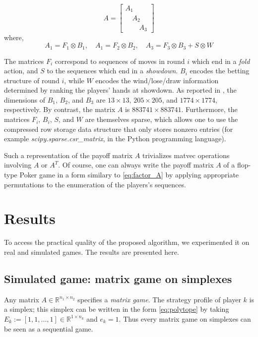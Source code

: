 \documentclass{article} %
\begin{document}
\begin{equation}
  A = \begin{bmatrix}A_1\hspace{2em}\\\hspace{1em}A_2\hspace{1em}\\\hspace{2em}A_3\end{bmatrix}
\label{eq:factor_A}
\end{equation}
where,
\begin{equation}
A_1 = F_1 \otimes B_1, \hspace{1em} A_1 = F_2 \otimes B_2, \hspace{1em} A_3 = F_3 \otimes B_3 + S \otimes W
\end{equation}

The matrices $F_i$ correspond to sequences of moves in round $i$ which end in a \textit{fold} action, and $S$ to the sequences which end in a \textit{showdown}. $B_i$ encodes the betting structure of round $i$, while $W$ encodes the wind/lose/draw information determined by ranking the players' hands at showdown. As reported in \cite{hoda2010smoothing}, the dimensions of $B_1$, $B_2$, and $B_3$ are $13 \times 13$, $205 \times 205$, and $1774 \times 1774$, respectively. By
contrast, the matrix $A$ is $883741 \times 883741$. Furthermore, the matrices $F_i$, $B_i$,
$S$, and $W$ are themselves sparse, which allows one to use the compressed row storage data structure that only stores nonzero entries (for example \textit{scipy.sparse.csr\_matrix}, in the Python programming language).

Such a representation of the payoff matrix $A$ trivializes matvec operations involving $A$ or $A^T$. Of course, one can always write the payoff matrix $A$ of a flop-type Poker game in a form similary to \eqref{eq:factor_A} by applying appropriate permutations to the enumeration of the players's sequences.

\section{Results}
To access the practical quality of the proposed algorithm, we experimented it on real and simulated games. The results are presented here.

\subsection{Simulated game: matrix game on simplexes}
Any matrix $A \in \mathbb{R}^{n_1 \times n_2}$ specifies a \textit{matrix game}. The strategy profile of player $k$ is a simplex; this simplex can be written in the form \eqref{eq:polytope} by taking $E_k := [1, 1, ..., 1] \in \mathbb{R}^{1 \times n_k}$ and $e_k = 1$. Thus every matrix game on simplexes can be seen as a sequential game.
\end{document}

